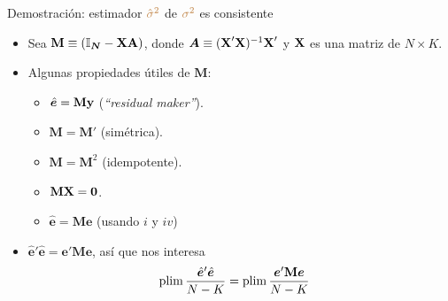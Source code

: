 \documentclass[10pt, xcolor=dvipsnames]{beamer}
\begin{document}
\begin{frame}{Demostración: estimador $\textcolor{brown}{\hat{\sigma}^2}$ de $\textcolor{brown}{\sigma^2}$ es consistente}\label{ANEX:estVarCons}
\begin{itemize}
\item Sea $\textbf{M} \equiv \left(\boldsymbol{\mathbb{I}_N} - \textbf{X} \textbf{A}\right)$, donde $\boldsymbol{A} \equiv (\textbf{X}'\textbf{X})^{-1}\textbf{X}'$ y \(\textbf{X}\) es una matriz de \(N \times K\). 
\item Algunas propiedades útiles de $\textbf{M}$: \vspace{0.2cm}
		\begin{itemize}
	\item[i.] $\hat{\boldsymbol{e}} = \textbf{M} \textbf{y}$ \hspace{0.37cm} (\textit{``residual maker''}).
	\item[ii.] $\textbf{M} = \textbf{M}'$ \hspace{0.3cm} (simétrica).
	\item[iii.] $\textbf{M} = \textbf{M}^2$ \hspace{0.3cm} (idempotente).	
	\item[iv.] $\textbf{M}\textbf{X} = \textbf{0}$.
	\item[v.] $\hat{\boldsymbol{e}} = \textbf{M}\boldsymbol{e}$ \hspace{0.37cm} (usando $i$ y $iv$) \vspace{0.3cm}
\end{itemize} 
\item $\hat{\boldsymbol{e}}'\hat{\boldsymbol{e}}= \boldsymbol{e}'\textbf{M}\boldsymbol{e}$, así que nos interesa
\begin{align*}
\begin{split}
	\plim \frac{\hat{\boldsymbol{e}}'\hat{\boldsymbol{e}}}{N-K}&= \plim \dfrac{\boldsymbol{e}'\textbf{M}\boldsymbol{e}}{N-K}
\end{split}
\end{align*}	
\end{itemize}
\end{frame}
\end{document}
